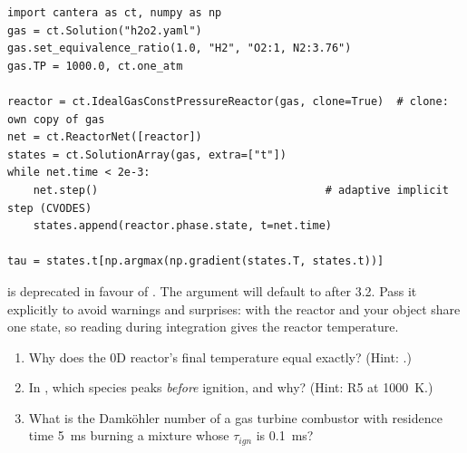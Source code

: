 \begin{lstlisting}
import cantera as ct, numpy as np
gas = ct.Solution("h2o2.yaml")
gas.set_equivalence_ratio(1.0, "H2", "O2:1, N2:3.76")
gas.TP = 1000.0, ct.one_atm

reactor = ct.IdealGasConstPressureReactor(gas, clone=True)  # clone: own copy of gas
net = ct.ReactorNet([reactor])
states = ct.SolutionArray(gas, extra=["t"])
while net.time < 2e-3:
    net.step()                                   # adaptive implicit step (CVODES)
    states.append(reactor.phase.state, t=net.time)

tau = states.t[np.argmax(np.gradient(states.T, states.t))]
\end{lstlisting}

\begin{warning}
 is deprecated in favour of . The  argument
will default to  after 3.2. Pass it explicitly to avoid warnings and surprises: with
 the reactor and your  object share one state, so reading
 during integration gives the reactor temperature.
\end{warning}

\begin{selfcheck}
\begin{enumerate}
  \item Why does the 0D reactor's final temperature equal  exactly?
        (Hint: .)
  \item In , which species peaks \emph{before} ignition, and why?
        (Hint: R5 at \SI{1000}{\kelvin}.)
  \item What is the Damköhler number of a gas turbine combustor with residence time
        \SI{5}{\milli\second} burning a mixture whose $\tau_{ign}$ is \SI{0.1}{\milli\second}?
\end{enumerate}
\end{selfcheck}
